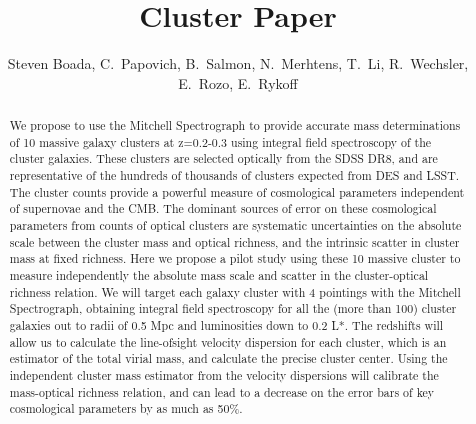 \documentclass[apj, twocolappendix]{emulateapj}
\begin{document}
\title{Cluster Paper}

\author{\sc Steven Boada, 
C.~Papovich,
B.~Salmon, 
N.~Merhtens,
T.~Li, 
R.~Wechsler,
E.~Rozo,
E.~Rykoff} 


\begin{abstract}
\noindent
%
We propose to use the Mitchell Spectrograph to provide accurate mass determinations of 10
massive galaxy clusters at z=0.2-0.3 using integral field spectroscopy of the cluster galaxies.
These clusters are selected optically from the SDSS DR8, and are representative of the hundreds
of thousands of clusters expected from DES and LSST. The cluster counts provide a powerful
measure of cosmological parameters independent of supernovae and the CMB. The dominant
sources of error on these cosmological parameters from counts of optical clusters are systematic
uncertainties on the absolute scale between the cluster mass and optical richness, and the intrinsic
scatter in cluster mass at fixed richness. Here we propose a pilot study using these 10 massive
cluster to measure independently the absolute mass scale and scatter in the cluster-optical richness
relation. We will target each galaxy cluster with 4 pointings with the Mitchell Spectrograph,
obtaining integral field spectroscopy for all the (more than 100) cluster galaxies out to radii of
0.5 Mpc and luminosities down to 0.2 L*. The redshifts will allow us to calculate the line-ofsight
velocity dispersion for each cluster, which is an estimator of the total virial mass, and
calculate the precise cluster center. Using the independent cluster mass estimator from the
velocity dispersions will calibrate the mass-optical richness relation, and can lead to a decrease
on the error bars of key cosmological parameters by as much as 50\%.
%
\end{abstract}
\end{document}
